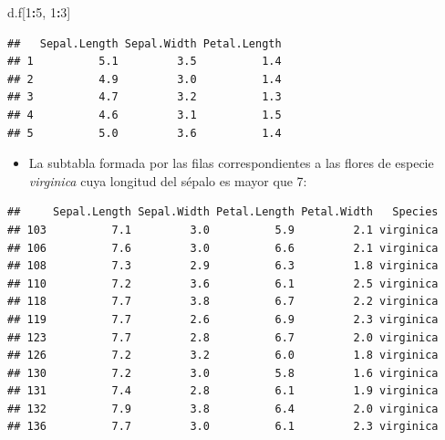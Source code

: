 \documentclass[]{book}
\newenvironment{Shaded}{\begin{snugshade}}{\end{snugshade}}
\newcommand{\DecValTok}[1]{\textcolor[rgb]{0.00,0.00,0.81}{#1}}
\newcommand{\NormalTok}[1]{#1}
\newcommand{\OperatorTok}[1]{\textcolor[rgb]{0.81,0.36,0.00}{\textbf{#1}}}
\newcommand{\StringTok}[1]{\textcolor[rgb]{0.31,0.60,0.02}{#1}}
\providecommand{\tightlist}{%
  \setlength{\itemsep}{0pt}\setlength{\parskip}{0pt}}
\theoremstyle{definition}
\theoremstyle{definition}
\theoremstyle{definition}
\theoremstyle{remark}
\begin{document}
\begin{Shaded}
\begin{Highlighting}[]
\NormalTok{d.f[}\DecValTok{1}\OperatorTok{:}\DecValTok{5}\NormalTok{, }\DecValTok{1}\OperatorTok{:}\DecValTok{3}\NormalTok{]}
\end{Highlighting}
\end{Shaded}

\begin{verbatim}
##   Sepal.Length Sepal.Width Petal.Length
## 1          5.1         3.5          1.4
## 2          4.9         3.0          1.4
## 3          4.7         3.2          1.3
## 4          4.6         3.1          1.5
## 5          5.0         3.6          1.4
\end{verbatim}

\begin{itemize}
\tightlist
\item
  La subtabla formada por las filas correspondientes a las flores de especie \emph{virginica} cuya longitud del sépalo es mayor que 7:
\end{itemize}

\begin{Shaded}
\end{Shaded}

\begin{verbatim}
##     Sepal.Length Sepal.Width Petal.Length Petal.Width   Species
## 103          7.1         3.0          5.9         2.1 virginica
## 106          7.6         3.0          6.6         2.1 virginica
## 108          7.3         2.9          6.3         1.8 virginica
## 110          7.2         3.6          6.1         2.5 virginica
## 118          7.7         3.8          6.7         2.2 virginica
## 119          7.7         2.6          6.9         2.3 virginica
## 123          7.7         2.8          6.7         2.0 virginica
## 126          7.2         3.2          6.0         1.8 virginica
## 130          7.2         3.0          5.8         1.6 virginica
## 131          7.4         2.8          6.1         1.9 virginica
## 132          7.9         3.8          6.4         2.0 virginica
## 136          7.7         3.0          6.1         2.3 virginica
\end{verbatim}
\end{document}
